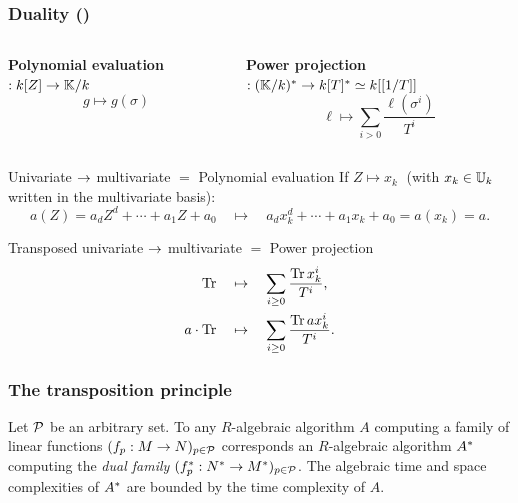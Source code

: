\documentclass[10pt,usepdftitle=false]{beamer}
\begin{document}

\begin{frame}
  \frametitle{Duality (\cite{shoup95,shoup99,bostan+salvy+schost03})}

  \vspace{-6mm}

  \begin{columns}[b]
    \begin{column}{0.4\textwidth}
      \begin{center}
        \textbf{Polynomial evaluation}$:k[Z]\rightarrow\mathbb{K}/k$
        \[g\mapsto g(\sigma)\]
      \end{center}
    \end{column}
    \begin{column}{0.6\textwidth}
      \begin{center}
        \textbf{Power projection}$:(\mathbb{K}/k)^\ast\rightarrow k[T]^\ast \simeq k[[1/T]]$
        \[\ell \mapsto \sum_{i>0} \frac{\ell(\sigma^i)}{T^i}\]
      \end{center}
    \end{column}
  \end{columns}

  \begin{block}{Univariate $\rightarrow$ multivariate $=$ Polynomial evaluation}
    If $Z \mapsto x_k\;$ (with $x_k\in\mathbb{U}_k$ written in the
    multivariate basis):
    \[a(Z) = a_dZ^d + \cdots + a_1Z + a_0 \quad\mapsto\quad a_dx_k^d + \cdots + a_1x_k + a_0 =a(x_k) = a\text{.}\]
  \end{block}

  \begin{block}{Transposed univariate $\rightarrow$ multivariate $=$ Power projection}
    \begin{align*}
      \operatorname{Tr} &\quad\mapsto\quad \sum_{i\ge0}\frac{\operatorname{Tr} x_k^i}{T^i}\text{,}\\
      a\cdot\operatorname{Tr} &\quad\mapsto\quad \sum_{i\ge0}\frac{\operatorname{Tr} ax_k^i}{T^i}\text{.}
    \end{align*}
  \end{block}
\end{frame}


\begin{frame}
  \frametitle{The transposition principle}

  \large
  
  \begin{theorem}
    Let $\mathcal{P}$ be an arbitrary set. To any $R$-algebraic algorithm
    $A$ computing a family of linear functions $(f_p:M\rightarrow
    N)_{p\in\mathcal{P}}$ corresponds an $R$-algebraic algorithm
    $A^\ast$ computing the \emph{dual family}
    $(f^\ast_p:N^\ast\rightarrow M^\ast)_{p\in\mathcal{P}}$. The algebraic
    time and space complexities of $A^\ast$ are bounded by the time
    complexity of $A$.
  \end{theorem}
  
\end{frame}
\end{document}
